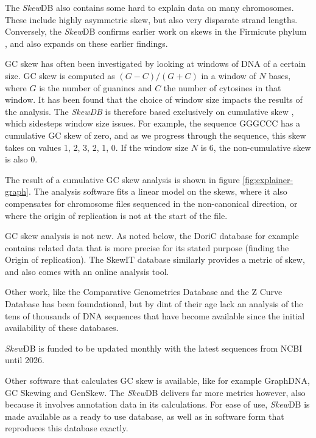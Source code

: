 \documentclass[fleqn,10pt]{wlscirep}
\begin{document}
The \emph{Skew}DB also contains some hard to explain data on many chromosomes. These include highly asymmetric skew, but also very disparate strand lengths. Conversely, the \emph{Skew}DB confirms earlier work on skews in the Firmicute phylum  \cite{charneski_atypical_2011}, and also expands on these earlier findings.

GC skew has often been investigated by looking at windows of DNA of a certain size. GC skew is computed as $(G-C)/(G+C)$ in a window of $N$ bases, where $G$ is the number of guanines and $C$ the number of cytosines in that window. It has been found that the choice of window size impacts the results of the analysis. The \emph{SkewDB} is therefore based exclusively on cumulative skew \cite{grigoriev_analyzing_1998}, which sidesteps window size issues. For example, the sequence GGGCCC has a cumulative GC skew of zero, and as we progress through the sequence, this skew takes on values 1, 2, 3, 2, 1, 0. If the window size $N$ is 6, the non-cumulative skew is also 0. 

The result of a cumulative GC skew analysis is shown in figure \ref{fig:explainer-graph}. The analysis software fits a linear model on the skews, where it also compensates for chromosome files sequenced in the non-canonical direction, or where the origin of replication is not at the start of the file.

GC skew analysis is not new. As noted below, the DoriC database for example contains related data that is more precise for its stated purpose (finding the Origin of replication). The SkewIT database \cite{lu_skewit_2020} similarly provides a metric of skew, and also comes with an online analysis tool.

Other work, like the Comparative Genometrics Database\cite{Roten2002} and the Z Curve Database \cite{Zhang2003} has been foundational, but by dint of their age lack an analysis of the tens of thousands of DNA sequences that have become available since the initial availability of these databases.

\emph{Skew}DB is funded to be updated monthly with the latest sequences from NCBI until 2026.

Other software that calculates GC skew is available, like for example GraphDNA\cite{Thomas2007}, GC Skewing\cite{Grigoriev1998} and GenSkew. The \emph{Skew}DB delivers far more metrics however, also because it involves annotation data in its calculations. For ease of use, \emph{Skew}DB is made available as a ready to use database, as well as in software form that reproduces this database exactly.
\end{document}

